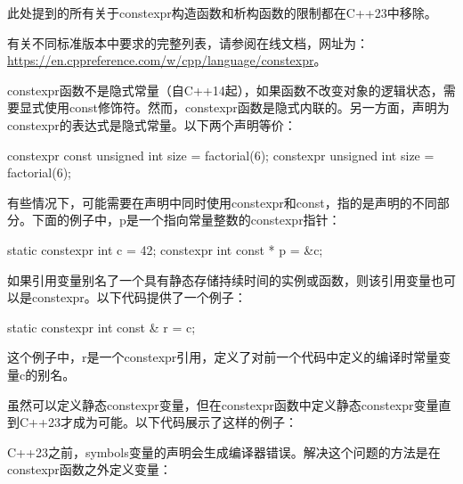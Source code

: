 \begin{myNotic}
此处提到的所有关于constexpr构造函数和析构函数的限制都在C++23中移除。
\end{myNotic}

\begin{myTip}
有关不同标准版本中要求的完整列表，请参阅在线文档，网址为：\url{https://en.cppreference.com/w/cpp/language/constexpr}。
\end{myTip}

constexpr函数不是隐式常量（自C++14起），如果函数不改变对象的逻辑状态，需要显式使用const修饰符。然而，constexpr函数是隐式内联的。另一方面，声明为constexpr的表达式是隐式常量。以下两个声明等价：

\begin{cpp}
constexpr const unsigned int size = factorial(6);
constexpr unsigned int size = factorial(6);
\end{cpp}

有些情况下，可能需要在声明中同时使用constexpr和const，指的是声明的不同部分。下面的例子中，p是一个指向常量整数的constexpr指针：

\begin{cpp}
static constexpr int c = 42;
constexpr int const * p = &c;
\end{cpp}

如果引用变量别名了一个具有静态存储持续时间的实例或函数，则该引用变量也可以是constexpr。以下代码提供了一个例子：

\begin{cpp}
static constexpr int const & r = c;
\end{cpp}

这个例子中，r是一个constexpr引用，定义了对前一个代码中定义的编译时常量变量c的别名。

虽然可以定义静态constexpr变量，但在constexpr函数中定义静态constexpr变量直到C++23才成为可能。以下代码展示了这样的例子：


C++23之前，symbols变量的声明会生成编译器错误。解决这个问题的方法是在constexpr函数之外定义变量：


